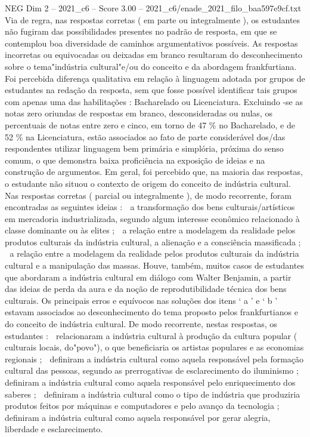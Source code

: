 \begin{textsample}{NEG Dim 2 – 2021\_c6 – Score 3.00 – 2021\_c6/enade\_2021\_filo\_baa597e9cf.txt}
Via de regra, nas respostas corretas ( em parte ou integralmente ), os estudantes não fugiram das possibilidades presentes no padrão de resposta, em que se contemplou boa diversidade de caminhos argumentativos possíveis.
As respostas incorretas ou equivocadas ou deixadas em branco resultaram do desconhecimento sobre o tema"indústria cultural"e/ou do conceito e da abordagem frankfurtiana.
Foi percebida diferença qualitativa em relação à linguagem adotada por grupos de estudantes na redação da resposta, sem que fosse possível identificar tais grupos com apenas uma das habilitações : Bacharelado ou Licenciatura.
Excluindo -se as notas zero oriundas de respostas em branco, desconsideradas ou nulas, os percentuais de notas entre zero e cinco, em torno de 47 \% no Bacharelado, e de 52 \% na Licenciatura, estão associados ao fato de parte considerável dos/das respondentes utilizar linguagem bem primária e simplória, próxima do senso comum, o que demonstra baixa proficiência na exposição de ideias e na construção de argumentos.
Em geral, foi percebido que, na maioria das respostas, o estudante não situou o contexto de origem do conceito de indústria cultural.
Nas respostas corretas ( parcial ou integralmente ), de modo recorrente, foram encontradas as seguintes ideias :  a transformação dos bens culturais/artísticos em mercadoria industrializada, segundo algum interesse econômico relacionado à classe dominante ou às elites ;  a relação entre a modelagem da realidade pelos produtos culturais da indústria cultural, a alienação e a consciência massificada ;  a relação entre a modelagem da realidade pelos produtos culturais da indústria cultural e a manipulação das massas.
Houve, também, muitos casos de estudantes que abordaram a indústria cultural em diálogo com Walter Benjamin, a partir das ideias de perda da aura e da noção de reprodutibilidade técnica dos bens culturais.
Os principais erros e equívocos nas soluções dos itens ‘ a ’ e ‘ b ' estavam associados ao desconhecimento do tema proposto pelos frankfurtianos e do conceito de indústria cultural.
De modo recorrente, nestas respostas, os estudantes :  relacionaram a indústria cultural à produção da cultura popular ( culturais locais, do"povo"), o que beneficiaria os artistas populares e as economias regionais ;  definiram a indústria cultural como aquela responsável pela formação cultural das pessoas, segundo as prerrogativas de esclarecimento do iluminismo ;  definiram a indústria cultural como aquela responsável pelo enriquecimento dos saberes ;  definiram a indústria cultural como o tipo de indústria que produziria produtos feitos por máquinas e computadores e pelo avanço da tecnologia ;  definiram a indústria cultural como aquela responsável por gerar alegria, liberdade e esclarecimento.

\end{textsample}
